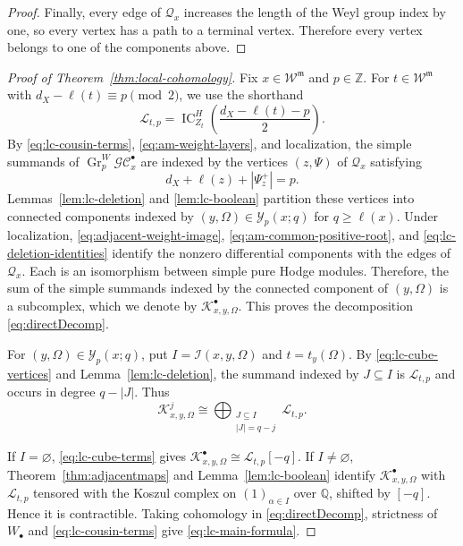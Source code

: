 \documentclass[12pt]{amsart}
\theoremstyle{definition}
\numberwithin{equation}{section}
\newcommand{\m}{\mathfrak m}
\newcommand{\W}{\mathscr W}
\begin{document}
\begin{proof}
Finally, every edge of $\mathscr Q_x$ increases
the length of the Weyl group index by one, so every vertex
has a path to a terminal vertex.
Therefore every vertex belongs to one of the components
above.
\end{proof}

\begin{proof}[Proof of Theorem~\ref{thm:local-cohomology}]
Fix $x\in\W^{\m}$ and $p\in\mathbb Z$. For $t\in\W^{\m}$ with $d_X-\ell(t)\equiv p\pmod2$,
we use the shorthand
\begin{equation}\label{eq:lc-tate-twist}
\mathscr L_{t,p}
=\operatorname{IC}_{Z_t}^H
\left(\frac{d_X-\ell(t)-p}{2}\right).
\end{equation}
By \eqref{eq:lc-cousin-terms}, \eqref{eq:am-weight-layers}, and
localization, the simple summands of
$\operatorname{Gr}^W_p\mathscr{GC}_x^\bullet$ are indexed by the
vertices $(z,\Psi)$ of $\mathscr Q_x$ satisfying
\[
d_X+\ell(z)+|\Psi_z^+|=p.
\]
Lemmas~\ref{lem:lc-deletion} and \ref{lem:lc-boolean} partition
these vertices into connected components indexed by
$(y,\Omega)\in\mathscr Y_p(x;q)$ for $q\geq\ell(x)$.
Under localization, \eqref{eq:adjacent-weight-image},
\eqref{eq:am-common-positive-root}, and
\eqref{eq:lc-deletion-identities} identify the nonzero differential
components with the edges of $\mathscr Q_x$. Each is an
isomorphism between simple pure Hodge modules. Therefore, the
sum of the simple summands indexed by the connected component
of $(y,\Omega)$ is a subcomplex, which we denote by
$\mathscr K_{x,y,\Omega}^\bullet$.
This proves the decomposition \eqref{eq:directDecomp}.

For $(y,\Omega)\in\mathscr Y_p(x;q)$, put
$I=\mathscr I(x,y,\Omega)$ and $t=t_y(\Omega)$.
By \eqref{eq:lc-cube-vertices} and Lemma~\ref{lem:lc-deletion},
the summand indexed by $J\subseteq I$ is $\mathscr L_{t,p}$
and occurs in degree $q-|J|$. Thus
\begin{equation}\label{eq:lc-cube-terms}
\mathscr K_{x,y,\Omega}^j
\cong\bigoplus_{\substack{J\subseteq I\\|J|=q-j}}
\mathscr L_{t,p}.
\end{equation}

If $I=\varnothing$, \eqref{eq:lc-cube-terms} gives
$\mathscr K_{x,y,\Omega}^{\bullet}\cong\mathscr L_{t,p}[-q]$. If $I\ne\varnothing$, Theorem~\ref{thm:adjacentmaps} and
Lemma~\ref{lem:lc-boolean} identify
$\mathscr K_{x,y,\Omega}^{\bullet}$ with $\mathscr L_{t,p}$ tensored with the Koszul complex on
$(1)_{\alpha\in I}$ over $\mathbb Q$, shifted by $[-q]$.
Hence it is contractible. Taking cohomology in
\eqref{eq:directDecomp}, strictness of $W_\bullet$ and
\eqref{eq:lc-cousin-terms} give \eqref{eq:lc-main-formula}.
\end{proof}
\end{document}

